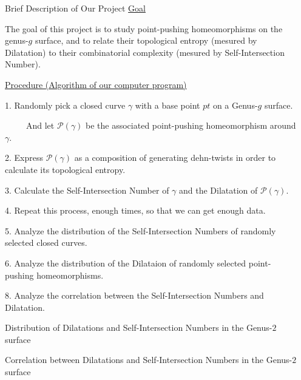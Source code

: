 \documentclass[leqno,presentation]{beamer}
\begin{document}
\begin{frame}
\begin{columns}[t]
\begin{column}[t]{.25\linewidth}
\end{column}

\begin{column}{.45\linewidth}

\begin{block}{Brief Description of Our Project}
\vspace{1ex}
\underline{Goal}

The goal of this project is to study point-pushing homeomorphisms on the genus-$g$ surface, and to relate their topological entropy (mesured by Dilatation) to their combinatorial complexity (mesured by Self-Intersection Number).
 
\underline{Procedure (Algorithm of our computer program)}

1. Randomly pick a closed curve $\gamma$ with a base point $pt$ on a Genus-$g$ surface.

~~~~~And let $\mathcal{P}(\gamma)$ be the associated point-pushing homeomorphism around $\gamma$.

2. Express $\mathcal{P}(\gamma)$ as a composition of generating dehn-twists in order to calculate its topological entropy.

3. Calculate the Self-Intersection Number of $\gamma$ and the Dilatation of $\mathcal{P}(\gamma)$.

4. Repeat this process, enough times, so that we can get enough data.

5. Analyze the distribution of the Self-Intersection Numbers of randomly selected closed curves.

6. Analyze the distribution of the Dilataion of randomly selected point-pushing homeomorphisms.

8. Analyze the correlation between the Self-Intersection Numbers and Dilatation.

\end{block}

\begin{block}{Distribution of Dilatations and Self-Intersection Numbers in the Genus-$2$ surface}
\vspace{32ex}
\end{block}

\begin{block}{Correlation between Dilatations and Self-Intersection Numbers in the Genus-$2$ surface}
\vspace{32ex}
\end{block}


\end{column}
\end{columns}
\end{frame}
\end{document}
